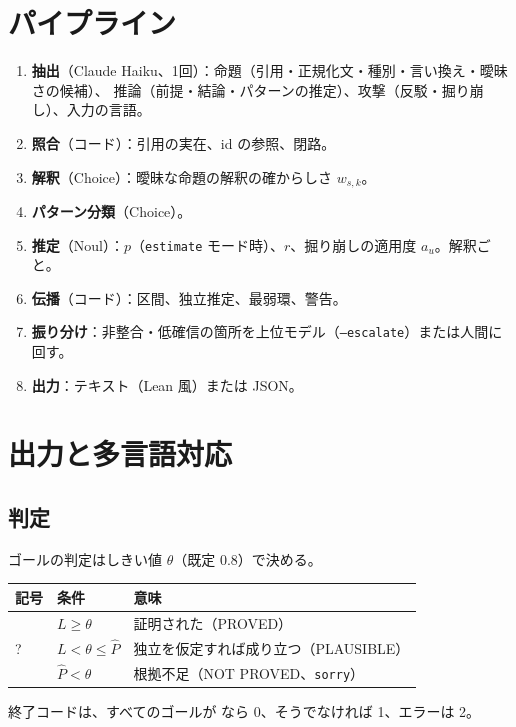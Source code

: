\documentclass[a4paper,11pt]{ltjsarticle}
\newcommand{\okmark}{\ding{51}}
\newcommand{\ngmark}{\ding{55}}
\begin{document}
\section{パイプライン}

\begin{enumerate}
  \item \textbf{抽出}（Claude Haiku、1回）：命題（引用・正規化文・種別・言い換え・曖昧さの候補）、
        推論（前提・結論・パターンの推定）、攻撃（反駁・掘り崩し）、入力の言語。
  \item \textbf{照合}（コード）：引用の実在、id の参照、閉路。
  \item \textbf{解釈}（Choice）：曖昧な命題の解釈の確からしさ $w_{s,k}$。
  \item \textbf{パターン分類}（Choice）。
  \item \textbf{推定}（Noul）：$p$（\texttt{estimate} モード時）、$r$、掘り崩しの適用度 $a_u$。解釈ごと。
  \item \textbf{伝播}（コード）：区間、独立推定、最弱環、警告。
  \item \textbf{振り分け}：非整合・低確信の箇所を上位モデル（\texttt{--escalate}）または人間に回す。
  \item \textbf{出力}：テキスト（Lean 風）または JSON。
\end{enumerate}

\section{出力と多言語対応}

\subsection{判定}

ゴールの判定はしきい値 $\theta$（既定 0.8）で決める。
\begin{center}
\begin{tabular}{lll}
\toprule
記号 & 条件 & 意味 \\
\midrule
\okmark & $L \ge \theta$ & 証明された（PROVED） \\
? & $L < \theta \le \hat P$ & 独立を仮定すれば成り立つ（PLAUSIBLE） \\
\ngmark & $\hat P < \theta$ & 根拠不足（NOT PROVED、\texttt{sorry}） \\
\bottomrule
\end{tabular}
\end{center}
終了コードは、すべてのゴールが \okmark なら 0、そうでなければ 1、エラーは 2。
\end{document}
